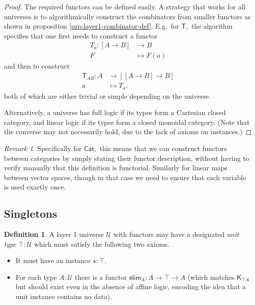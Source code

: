 \documentclass[a4paper]{article}
\theoremstyle{definition}
\newtheorem{definition}{Definition}[section]
\theoremstyle{remark}
\newtheorem*{remark}{Remark}
\newcommand{\defn}{\emph}
\newcommand{\U}{\mathcal{U}}
\newcommand{\nm}{\mathsf}
\newcommand{\universe}{\nm}
\newcommand{\Cat}{\universe{Cat}}
\newcommand{\elim}{\nm{elim}}
\newcommand{\combinator}{\nm}
\newcommand{\revAppFun}{\combinator{T}}
\newcommand{\constFun}{\combinator{K}}
\begin{document}
\begin{proof}
  The required functors can be defined easily. A strategy that works for all universes is to
  algorithmically construct the combinators from smaller functors as shown in proposition
  \ref{prp:layer1-combinator-def}. E.g.\ for $\revAppFun,$ the algorithm specifies that one first
  needs to construct a functor
  \begin{align*}
    T_a : [A \to B] &\to     B\\
          F         &\mapsto F(a)
  \end{align*}
  and then to construct
  \begin{align*}
    \revAppFun_{AB} : A &\to     [[A \to B] \to B]\\
                      a &\mapsto T_a,
  \end{align*}
  both of which are either trivial or simple depending on the universe.

  Alternatively, a universe has full logic if its types form a Cartesian closed category, and linear
  logic if its types form a closed monoidal category. (Note that the converse may not necessarily
  hold, due to the lack of axioms on instances.)
\end{proof}

\begin{remark}
  Specifically for $\Cat,$ this means that we can construct functors between categories by simply
  stating their functor description, without having to verify manually that this definition is
  functorial. Similarly for linear maps between vector spaces, though in that case we need to
  ensure that each variable is used exactly once.
\end{remark}

\subsection{Singletons}
\label{sec:layer1-singletons}

\begin{definition}
  A layer 1 universe $\U$ with functors may have a designated \defn{unit type} $\top : \U$ which
  must satisfy the following two axioms.
  \begin{itemize}
    \item It must have an instance $\star : \top.$
    \item For each type $A : \U$ there is a functor $\elim_A : A \to \top \to A$ (which matches
    $\constFun_{\top A}$ but should exist even in the absence of affine logic, encoding the idea
    that a unit instance contains no data).
  \end{itemize}
\end{definition}
\end{document}
